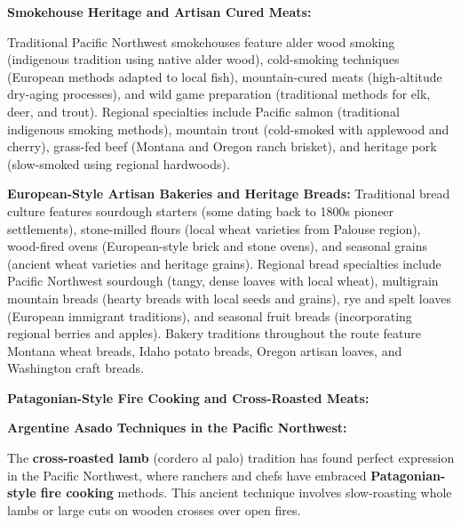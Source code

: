 \documentclass[
  11pt,
  letterpaper,
  DIV=10,
  numbers=noendperiod]{scrartcl}
\begin{document}
\textbf{Smokehouse Heritage and Artisan Cured Meats:}

Traditional Pacific Northwest smokehouses feature alder wood smoking
(indigenous tradition using native alder wood), cold-smoking techniques
(European methods adapted to local fish), mountain-cured meats
(high-altitude dry-aging processes), and wild game preparation
(traditional methods for elk, deer, and trout). Regional specialties
include Pacific salmon (traditional indigenous smoking methods),
mountain trout (cold-smoked with applewood and cherry), grass-fed beef
(Montana and Oregon ranch brisket), and heritage pork (slow-smoked using
regional hardwoods).

\textbf{European-Style Artisan Bakeries and Heritage Breads:}
Traditional bread culture features sourdough starters (some dating back
to 1800s pioneer settlements), stone-milled flours (local wheat
varieties from Palouse region), wood-fired ovens (European-style brick
and stone ovens), and seasonal grains (ancient wheat varieties and
heritage grains). Regional bread specialties include Pacific Northwest
sourdough (tangy, dense loaves with local wheat), multigrain mountain
breads (hearty breads with local seeds and grains), rye and spelt loaves
(European immigrant traditions), and seasonal fruit breads
(incorporating regional berries and apples). Bakery traditions
throughout the route feature Montana wheat breads, Idaho potato breads,
Oregon artisan loaves, and Washington craft breads.

\textbf{Patagonian-Style Fire Cooking and Cross-Roasted Meats:}

\textbf{Argentine Asado Techniques in the Pacific Northwest:}

The \textbf{cross-roasted lamb} (cordero al palo) tradition has found
perfect expression in the Pacific Northwest, where ranchers and chefs
have embraced \textbf{Patagonian-style fire cooking} methods. This
ancient technique involves slow-roasting whole lambs or large cuts on
wooden crosses over open fires.
\end{document}
